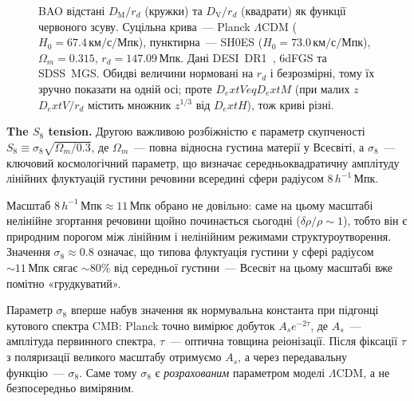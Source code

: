 \begin{figure}[h!]
\caption{BAO відстані $D_\text{M}/r_d$ (кружки) та $D_\text{V}/r_d$ (квадрати) як функції
червоного зсуву. Суцільна крива~--- Planck $\Lambda$CDM ($H_0 = 67.4\,\text{км/с/Мпк}$),
пунктирна~--- SH0ES ($H_0 = 73.0\,\text{км/с/Мпк}$), $\Omega_m = 0.315$,
$r_d = 147.09\,\text{Мпк}$. Дані DESI~DR1~\cite{DESI2024}, 6dFGS та SDSS~MGS.
Обидві величини нормовані на $r_d$ і безрозмірні, тому їх зручно показати на одній осі;
проте $D_	ext{V}
eq D_	ext{M}$ (при малих $z$ $D_	ext{V}/r_d$ містить множник $z^{1/3}$ від $D_	ext{H}$), тож криві різні.}
\label{fig:bao_all}
\end{figure}


\textbf{The $S_8$ tension.}
Другою важливою розбіжністю є параметр скупченості $S_8 \equiv \sigma_8 \sqrt{\Omega_m / 0.3}$,
де $\Omega_m$~--- повна відносна густина матерії у Всесвіті, а $\sigma_8$~---
ключовий космологічний параметр, що визначає середньоквадратичну амплітуду
лінійних флуктуацій густини речовини всередині сфери радіусом $8\,h^{-1}\,\text{Мпк}$.

Масштаб $8\,h^{-1}\,\text{Мпк} \approx 11\,\text{Мпк}$ обрано не довільно: саме
на цьому масштабі нелінійне згортання речовини щойно починається сьогодні
($\delta\rho/\rho \sim 1$), тобто він є природним порогом між лінійним і
нелінійним режимами структуроутворення. Значення $\sigma_8 \approx 0.8$ означає,
що типова флуктуація густини у сфері радіусом $\sim 11\,\text{Мпк}$ сягає
$\sim 80\%$ від середньої густини~--- Всесвіт на цьому масштабі вже помітно
«грудкуватий».

Параметр $\sigma_8$ вперше набув значення як нормувальна константа при підгонці
кутового спектра CMB: Planck точно вимірює добуток $A_s e^{-2\tau}$, де $A_s$~---
амплітуда первинного спектра, $\tau$~--- оптична товщина реіонізації. Після
фіксації $\tau$ з поляризації великого масштабу отримуємо $A_s$, а через
передавальну функцію~--- $\sigma_8$. Саме тому $\sigma_8$ є \emph{розрахованим}
параметром моделі $\Lambda$CDM, а не безпосередньо виміряним.

